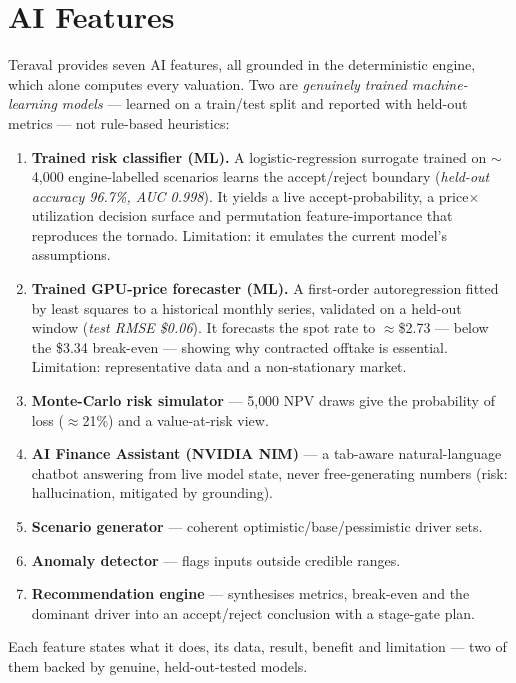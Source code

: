 \documentclass[12pt,a4paper]{article}
\begin{document}
\section{AI Features}
Teraval provides seven AI features, all grounded in the deterministic engine, which alone computes
every valuation. Two are \emph{genuinely trained machine-learning models} --- learned on a
train/test split and reported with held-out metrics --- not rule-based heuristics:
\begin{enumerate}[leftmargin=1.4em,itemsep=1pt]
\item \textbf{Trained risk classifier (ML).} A logistic-regression surrogate trained on
$\sim$4{,}000 engine-labelled scenarios learns the accept/reject boundary (\emph{held-out accuracy
96.7\%, AUC 0.998}). It yields a live accept-probability, a price$\times$utilization decision surface
and permutation feature-importance that reproduces the tornado. Limitation: it emulates the current
model's assumptions.
\item \textbf{Trained GPU-price forecaster (ML).} A first-order autoregression fitted by least
squares to a historical monthly series, validated on a held-out window (\emph{test RMSE \$0.06}).
It forecasts the spot rate to $\approx$\$2.73 --- below the \$3.34 break-even --- showing why
contracted offtake is essential. Limitation: representative data and a non-stationary market.
\item \textbf{Monte-Carlo risk simulator} --- 5{,}000 NPV draws give the probability of loss
($\approx$21\%) and a value-at-risk view.
\item \textbf{AI Finance Assistant (NVIDIA NIM)} --- a tab-aware natural-language chatbot answering
from live model state, never free-generating numbers (risk: hallucination, mitigated by grounding).
\item \textbf{Scenario generator} --- coherent optimistic/base/pessimistic driver sets.
\item \textbf{Anomaly detector} --- flags inputs outside credible ranges.
\item \textbf{Recommendation engine} --- synthesises metrics, break-even and the dominant driver
into an accept/reject conclusion with a stage-gate plan.
\end{enumerate}
Each feature states what it does, its data, result, benefit and limitation --- two of them backed by
genuine, held-out-tested models.

\end{document}
